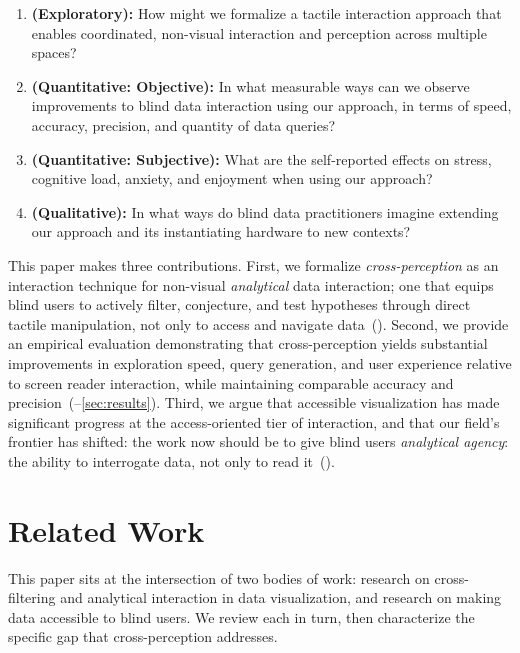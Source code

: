 \documentclass[12pt]{cmuthesis}
\begin{document}
\newcommand{\goalref}[1]{\hyperref[goal:#1]{#1}}
\newcommand{\rqref}[1]{\hyperref[rq:#1]{#1}}

\begin{enumerate}[label=\textbf{R\arabic*}]
    \item \label{rq-cf:R1}\textbf{(Exploratory):} How might we formalize a tactile interaction approach that enables coordinated, non-visual interaction and perception across multiple spaces?
    \item \label{rq-cf:R2}\textbf{(Quantitative: Objective):} In what measurable ways can we observe improvements to blind data interaction using our approach, in terms of speed, accuracy, precision, and quantity of data queries?
    \item \label{rq-cf:R3}\textbf{(Quantitative: Subjective):} What are the self-reported effects on stress, cognitive load, anxiety, and enjoyment when using our approach?
    \item \label{rq-cf:R4}\textbf{(Qualitative):} In what ways do blind data practitioners imagine extending our approach and its instantiating hardware to new contexts?
\end{enumerate}

This paper makes three contributions. First, we formalize \textit{cross-perception} as an interaction technique for non-visual \textit{analytical} data interaction; one that equips blind users to actively filter, conjecture, and test hypotheses through direct tactile manipulation, not only to access and navigate data~(). Second, we provide an empirical evaluation demonstrating that cross-perception yields substantial improvements in exploration speed, query generation, and user experience relative to screen reader interaction, while maintaining comparable accuracy and precision~(--\ref{sec:results}). Third, we argue that accessible visualization has made significant progress at the access-oriented tier of interaction, and that our field's frontier has shifted: the work now should be to give blind users \textit{analytical agency}: the ability to interrogate data, not only to read it~().

\section{Related Work}
\label{sec:relwork}

This paper sits at the intersection of two bodies of work: research on cross-filtering and analytical interaction in data visualization, and research on making data accessible to blind users. We review each in turn, then characterize the specific gap that cross-perception addresses.
\end{document}
